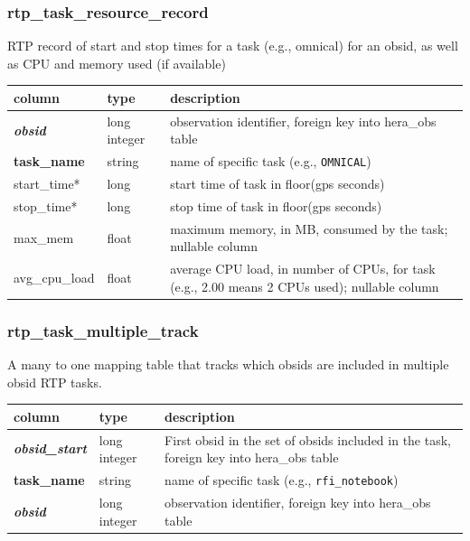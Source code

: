\documentclass{article}
\begin{document}
{\subsubsection{rtp\_task\_resource\_record}
RTP record of start and stop times for a task (e.g., omnical) for an obsid, as well as CPU and memory used (if available)
\begin{center}
  \begin{tabular}{| p{4cm} | p{2cm} | p{10cm} |}
\hline
 column & type & description \\ [0.5ex] \hline\hline
\textit{\textbf{obsid}} & long integer & observation identifier, foreign key into hera\_obs table \\ \hline
\textbf{task\_name} & string & name of specific task (e.g., \verb+OMNICAL+) \\ \hline
start\_time* & long & start time of task in floor(gps seconds) \\ \hline
stop\_time* & long & stop time of task in floor(gps seconds) \\ \hline
max\_mem & float & maximum memory, in MB, consumed by the task; nullable column \\ \hline
avg\_cpu\_load & float & average CPU load, in number of CPUs, for task (e.g., 2.00 means 2 CPUs used); nullable column \\ \hline
\end{tabular}
\end{center}

\subsubsection{rtp\_task\_multiple\_track}
A many to one mapping table that tracks which obsids are included in multiple obsid RTP tasks.
\begin{center}
  \begin{tabular}{| p{4cm} | p{2cm} | p{10cm} |}
\hline
 column & type & description \\ [0.5ex] \hline\hline
\textit{\textbf{obsid\_start}} & long integer & First obsid in the set of obsids included in the task, foreign key into hera\_obs table \\ \hline
\textbf{task\_name} & string & name of specific task (e.g., \verb+rfi_notebook+) \\ \hline
\textit{\textbf{obsid}} & long integer & observation identifier, foreign key into hera\_obs table \\ \hline
\end{tabular}
\end{center}

}
\end{document}
